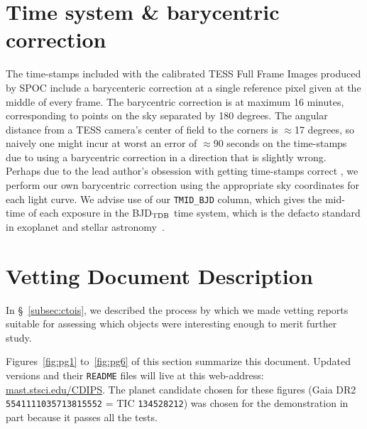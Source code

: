 \documentclass[12pt,twocolumn,tighten]{aastex62}
\begin{document}
\appendix
\section{Time system \& barycentric correction}
The time-stamps included with the calibrated TESS Full Frame Images
produced by SPOC include a barycenteric correction at
a single reference pixel given at the middle of every frame.
The barycentric correction is at maximum 16 minutes, corresponding to
points on the sky separated by 180 degrees.
The angular distance from a TESS camera's center of field to the corners
is $\approx$17 degrees, so naively one might incur at worst an error of
$\approx$90 seconds on the time-stamps due to using a barycentric
correction in a direction that is slightly wrong.
Perhaps due to the lead author's obsession with getting time-stamps correct 
\citep{bouma_wasp-4b_2019},
we perform our own barycentric correction using the appropriate
sky coordinates for each light curve.
We advise use of our \texttt{TMID\_BJD} column, which gives the
mid-time of each exposure in the BJD$_{\rm TDB}$ time system, which
is the defacto standard in exoplanet and stellar
astronomy~\citep{eastman_achieving_2010}.

\section{Vetting Document Description}

In \S~\ref{subsec:ctois}, we described the process by which we made 
vetting reports suitable for assessing which objects were interesting 
enough to merit further study.

Figures~\ref{fig:pg1} to~\ref{fig:pg6} of this
section summarize this document. Updated versions and their 
\texttt{README} files will live at this web-address: 
\url{mast.stsci.edu/CDIPS}.
The planet candidate chosen for these figures
(Gaia DR2 \texttt{5541111035713815552} = TIC \texttt{134528212}) was
chosen for the demonstration in part because it passes all
the tests.
\end{document}
